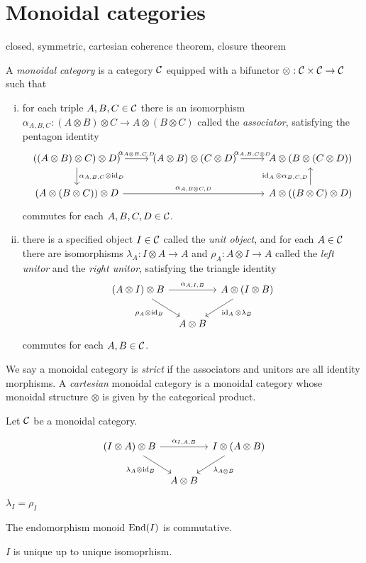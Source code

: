 \documentclass{../../large}
\begin{document}
\section{Monoidal categories}
closed, symmetric, cartesian
coherence theorem, closure theorem


\begin{prb}
A \emph{monoidal category} is a category $\mathcal{C}$ equipped with a bifunctor $\otimes:\mathcal{C}\times\mathcal{C}\to\mathcal{C}$ such that
\begin{enumerate}[(i)]
\item for each triple $A,B,C\in\mathcal{C}$ there is an isomorphism $\alpha_{A,B,C}:(A\otimes B)\otimes C\to A\otimes(B\otimes C)$ called the \emph{associator}, satisfying the pentagon identity
\[\begin{tikzcd}
((A\otimes B)\otimes C)\otimes D) \rar{\alpha_{A\otimes B,C,D}} \dar{\alpha_{A,B,C}\otimes\id_D} &
(A\otimes B)\otimes(C\otimes D) \rar{\alpha_{A,B,C\otimes D}} &
A\otimes(B\otimes(C\otimes D))\\
(A\otimes(B\otimes C))\otimes D \ar{rr}{\alpha_{A,B\otimes C,D}} &&
A\otimes((B\otimes C)\otimes D) \uar{\id_A\otimes\alpha_{B,C,D}}
\end{tikzcd}\]
commutes for each $A,B,C,D\in\mathcal{C}$.
\item there is a specified object $I\in\mathcal{C}$ called the \emph{unit object}, and for each $A\in\mathcal{C}$ there are isomorphisms $\lambda_A:I\otimes A\to A$ and $\rho_A:A\otimes I\to A$ called the \emph{left unitor} and the \emph{right unitor}, satisfying the triangle identity
\[\begin{tikzcd}[column sep=tiny]
(A\otimes I)\otimes B \ar{rr}{\alpha_{A,I,B}} \ar[swap]{dr}{\rho_A\otimes\id_B} &&
A\otimes(I\otimes B) \ar{dl}{\id_A\otimes\lambda_B}\\
& A\otimes B &
\end{tikzcd}\]
commutes for each $A,B\in\mathcal{C}$.
\end{enumerate}
We say a monoidal category is \emph{strict} if the associators and unitors are all identity morphisms.
A \emph{cartesian} monoidal category is a monoidal category whose monoidal structure $\otimes$ is given by the categorical product.
\end{prb}


\begin{prb}
Let $\mathcal{C}$ be a monoidal category.
\begin{parts}
\item
\[\begin{tikzcd}[column sep=tiny]
(I\otimes A)\otimes B \ar{rr}{\alpha_{I,A,B}} \ar[swap]{dr}{\lambda_A\otimes\id_B} &&
I\otimes(A\otimes B) \ar{dl}{\lambda_{A\otimes B}}\\
& A\otimes B &
\end{tikzcd}\]
\item $\lambda_I=\rho_I$
\item The endomorphism monoid $\operatorname{End}(I)$ is commutative.
\item $I$ is unique up to unique isomoprhism.
\end{parts}
\end{prb}
\end{document}
